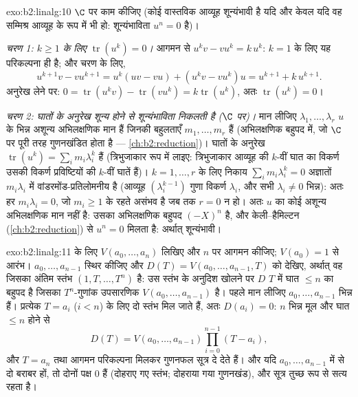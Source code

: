 \begin{solution}{exo:b2:linalg:10}
$\C$ पर काम कीजिए (कोई वास्तविक आव्यूह शून्यंभावी है यदि और केवल यदि वह
सम्मिश्र आव्यूह के रूप में भी हो: शून्यंभाविता $u^n = 0$ है)।

\emph{चरण 1: $k \geq 1$ के लिए $\operatorname{tr}(u^k) = 0$।} आगमन से $u^k v - v u^k = k\, u^k$: $k = 1$ के लिए यह परिकल्पना
ही है; और चरण के लिए,
\[
u^{k+1}v - vu^{k+1} = u^k(uv - vu) + (u^k v - v u^k)u
= u^{k+1} + k\,u^{k+1} .
\]
अनुरेख लेने पर: $0 = \operatorname{tr}(u^k v) -
\operatorname{tr}(vu^k) = k \operatorname{tr}(u^k)$, अतः $\operatorname{tr}(u^k) = 0$।

\emph{चरण 2: घातों के अनुरेख शून्य होने से शून्यंभाविता निकलती है
($\C$ पर)।} मान लीजिए $\lambda_1, \dots, \lambda_r$ $u$ के भिन्न अशून्य अभिलक्षणिक मान हैं जिनकी
बहुलताएँ $m_1, \dots, m_r$ हैं (अभिलक्षणिक बहुपद में, जो $\C$ पर पूरी तरह गुणनखंडित
होता है --- \cref{ch:b2:reduction})। घातों के अनुरेख $\operatorname{tr}(u^k) =
\sum_i m_i \lambda_i^k$ हैं (त्रिभुजाकार रूप में
लाइए: त्रिभुजाकार आव्यूह की $k$-वीं घात का विकर्ण उसकी विकर्ण
प्रविष्टियों की $k$-वीं घातें हैं)। $k = 1, \dots, r$ के लिए निकाय $\sum_i m_i
\lambda_i^k = 0$ अज्ञातों
$m_i\lambda_i$ में वांडरमोंड-प्रतिलोमनीय है (आव्यूह $(\lambda_i^{k-1})$ गुणा विकर्ण $\lambda_i$, और
सभी $\lambda_i \neq 0$ भिन्न): अतः हर $m_i
\lambda_i = 0$, जो $m_i \geq 1$ के रहते असंभव है जब तक $r = 0$ न
हो। अतः $u$ का कोई अशून्य अभिलक्षणिक मान नहीं है: उसका अभिलक्षणिक
बहुपद $(-X)^n$ है, और केली--हैमिल्टन (\cref{ch:b2:reduction}) से $u^n
= 0$ मिलता है: अर्थात्
शून्यंभावी।
\end{solution}

\begin{solution}{exo:b2:linalg:11}
 के लिए $V(a_0, \dots, a_n)$ लिखिए और $n$ पर आगमन कीजिए; $V(a_0) = 1$ से आरंभ। $a_0, \dots, a_{n-1}$ स्थिर
कीजिए और $D(T) =
V(a_0, \dots, a_{n-1}, T)$ को देखिए, अर्थात् वह  जिसका अंतिम स्तंभ $(1,
T, \dots, T^n)$ है: उस
स्तंभ के अनुदिश खोलने पर $D$ $T$ में घात $\leq n$ का बहुपद है जिसका
$T^n$-गुणांक उपसारणिक $V(a_0, \dots, a_{n-1})$ है। पहले मान लीजिए $a_0, \dots,
a_{n-1}$ भिन्न हैं। प्रत्येक
$T = a_i$ ($i < n$) के लिए दो स्तंभ मिल जाते हैं, अतः $D(a_i) = 0$: $n$ भिन्न मूल और
घात $\leq n$ होने से
\[
D(T) = V(a_0, \dots, a_{n-1}) \prod_{i=0}^{n-1}(T - a_i),
\]
और $T = a_n$ तथा आगमन परिकल्पना मिलकर गुणनफल सूत्र दे देते हैं। और यदि $a_0, \dots, a_{n-1}$
में से दो बराबर हों, तो दोनों पक्ष $0$ हैं (दोहराए गए स्तंभ; दोहराया
गया गुणनखंड), और सूत्र तुच्छ रूप से सत्य रहता है।
\end{solution}

